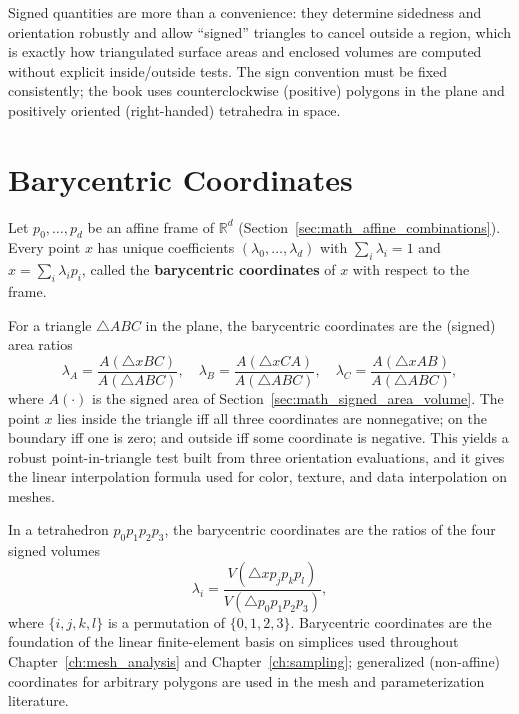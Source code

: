 Signed quantities are more than a convenience: they determine sidedness and
orientation robustly and allow ``signed'' triangles to cancel outside a
region, which is exactly how triangulated surface areas and enclosed volumes
are computed without explicit inside/outside tests. The sign convention must
be fixed consistently; the book uses counterclockwise (positive) polygons in
the plane and positively oriented (right-handed) tetrahedra in space.


\section{Barycentric Coordinates}
\label{sec:math_barycentric}

Let $p_0,\dots,p_d$ be an affine frame of $\mathbb{R}^d$ (Section~\ref{sec:math_affine_combinations}).
Every point $x$ has unique coefficients $(\lambda_0,\dots,\lambda_d)$ with
$\sum_i \lambda_i = 1$ and $x = \sum_i \lambda_i p_i$, called the
\textbf{barycentric coordinates} of $x$ with respect to the frame.

For a triangle $\triangle ABC$ in the plane, the barycentric coordinates
are the (signed) area ratios
\[
  \lambda_A = \frac{A(\triangle xBC)}{A(\triangle ABC)},\quad
  \lambda_B = \frac{A(\triangle xCA)}{A(\triangle ABC)},\quad
  \lambda_C = \frac{A(\triangle xAB)}{A(\triangle ABC)},
\]
where $A(\cdot)$ is the signed area of Section~\ref{sec:math_signed_area_volume}.
The point $x$ lies inside the triangle iff all three coordinates are
nonnegative; on the boundary iff one is zero; and outside iff some coordinate
is negative. This yields a robust point-in-triangle test built from three
orientation evaluations, and it gives the linear interpolation formula used
for color, texture, and data interpolation on meshes.

In a tetrahedron $p_0 p_1 p_2 p_3$, the barycentric coordinates are the
ratios of the four signed volumes
\[
  \lambda_i = \frac{V(\triangle x p_j p_k p_l)}{V(\triangle p_0 p_1 p_2 p_3)},
\]
where $\{i,j,k,l\}$ is a permutation of $\{0,1,2,3\}$. Barycentric
coordinates are the foundation of the linear finite-element basis on
simplices used throughout Chapter~\ref{ch:mesh_analysis} and
Chapter~\ref{ch:sampling}; generalized (non-affine) coordinates for
arbitrary polygons are used in the mesh and parameterization literature.


